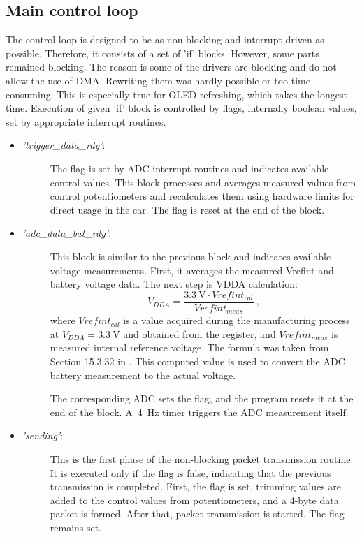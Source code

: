 \subsection{Main control loop}
The control loop is designed to be as non-blocking and interrupt-driven as possible. Therefore, it consists of a set of 'if' blocks. However, some parts remained blocking. The reason is some of the drivers are blocking and do not allow the use of DMA. Rewriting them was hardly possible or too time-consuming. This is especially true for OLED refreshing, which takes the longest time. Execution of given 'if' block is controlled by flags, internally boolean values, set by appropriate interrupt routines.
\begin{itemize}
	\item \begin{description}
\item[\textit{'trigger\_data\_rdy'}:]
The flag is set by ADC interrupt routines and indicates available control values. This block processes and averages measured values from control potentiometers and recalculates them using hardware limits for direct usage in the car. The flag is reset at the end of the block.
\end{description}

	\item \begin{description}
\item[\textit{'adc\_data\_bat\_rdy'}:]
This block is similar to the previous block and indicates available voltage measurements.  First, it averages the measured Vrefint and battery voltage data. The next step is VDDA calculation:
\begin{equation}
	V_{DDA} = \frac{\SI{3.3}{\V} \cdot Vrefint_{cal}}{Vrefint_{meas}}\ ,
\end{equation}
where $Vrefint_{cal}$ is a value acquired during the manufacturing process at $V_{DDA} = \SI{3.3}{\V}$ and obtained from the register, and $Vrefint_{meas}$ is measured internal reference voltage. The formula was taken from Section 15.3.32 in \cite{f303_ref}. This computed value is used to convert the ADC battery measurement to the actual voltage.

The corresponding ADC sets the flag, and the program resets it at the end of the block. A~\SI{4}{\Hz} timer triggers the ADC measurement itself.
\end{description}

	\item \begin{description}
\item[\textit{'sending'}:]
This is the first phase of the non-blocking packet transmission routine. It is executed only if the flag is false, indicating that the previous transmission is completed. First, the flag is set, trimming values are added to the control values from potentiometers, and a 4-byte data packet is formed. After that, packet transmission is started. The flag remains set.
\end{description}


\end{itemize}
